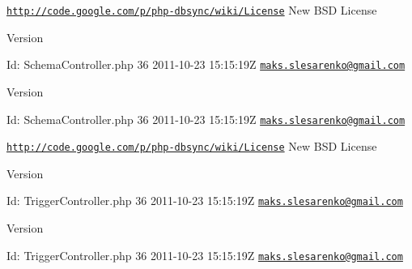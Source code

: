 \href{http://code.google.com/p/php-dbsync/wiki/License}{\tt http://code.google.com/p/php-\/dbsync/wiki/License} New BSD License \begin{DoxyVersion}{Version}

\end{DoxyVersion}
\begin{DoxyParagraph}{Id:}
SchemaController.php 36 2011-\/10-\/23 15:15:19Z \href{mailto:maks.slesarenko@gmail.com}{\tt maks.slesarenko@gmail.com} 
\end{DoxyParagraph}


\begin{DoxyVersion}{Version}

\end{DoxyVersion}
\begin{DoxyParagraph}{Id:}
SchemaController.php 36 2011-\/10-\/23 15:15:19Z \href{mailto:maks.slesarenko@gmail.com}{\tt maks.slesarenko@gmail.com} 
\end{DoxyParagraph}


\href{http://code.google.com/p/php-dbsync/wiki/License}{\tt http://code.google.com/p/php-\/dbsync/wiki/License} New BSD License \begin{DoxyVersion}{Version}

\end{DoxyVersion}
\begin{DoxyParagraph}{Id:}
TriggerController.php 36 2011-\/10-\/23 15:15:19Z \href{mailto:maks.slesarenko@gmail.com}{\tt maks.slesarenko@gmail.com} 
\end{DoxyParagraph}


\begin{DoxyVersion}{Version}

\end{DoxyVersion}
\begin{DoxyParagraph}{Id:}
TriggerController.php 36 2011-\/10-\/23 15:15:19Z \href{mailto:maks.slesarenko@gmail.com}{\tt maks.slesarenko@gmail.com} 
\end{DoxyParagraph}
